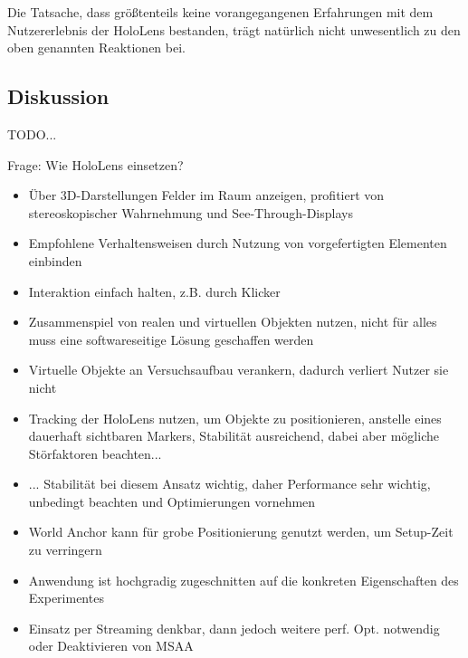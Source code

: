 Die Tatsache, dass größtenteils keine vorangegangenen Erfahrungen mit dem Nutzererlebnis der HoloLens bestanden, trägt natürlich nicht unwesentlich zu den oben genannten Reaktionen bei.\\

\subsection{Diskussion}
TODO...

Frage: Wie HoloLens einsetzen?

\begin{itemize}
	\item Über 3D-Darstellungen Felder im Raum anzeigen, profitiert von stereoskopischer Wahrnehmung und See-Through-Displays
	\item Empfohlene Verhaltensweisen durch Nutzung von vorgefertigten Elementen einbinden
	\item Interaktion einfach halten, z.B. durch Klicker
	\item Zusammenspiel von realen und virtuellen Objekten nutzen, nicht für alles muss eine softwareseitige Lösung geschaffen werden
	\item Virtuelle Objekte an Versuchsaufbau verankern, dadurch verliert Nutzer sie nicht
	\item Tracking der HoloLens nutzen, um Objekte zu positionieren, anstelle eines dauerhaft sichtbaren Markers, Stabilität ausreichend, dabei aber mögliche Störfaktoren beachten...
	\item ... Stabilität bei diesem Ansatz wichtig, daher Performance sehr wichtig, unbedingt beachten und Optimierungen vornehmen
	\item World Anchor kann für grobe Positionierung genutzt werden, um Setup-Zeit zu verringern
	\item Anwendung ist hochgradig zugeschnitten auf die konkreten Eigenschaften des Experimentes
	\item Einsatz per Streaming denkbar, dann jedoch weitere perf. Opt. notwendig oder Deaktivieren von MSAA
\end{itemize}


